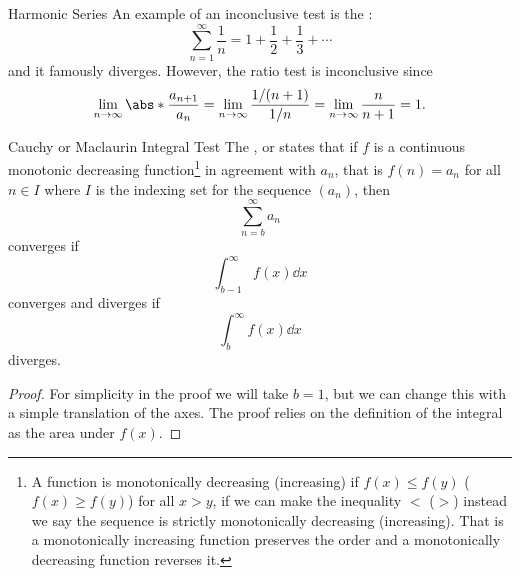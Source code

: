 \documentclass[fleqn]{NotesClass}
\begin{document}
    \begin{dfn}{Harmonic Series}{}
        An example of an inconclusive test is the :
        \begin{equation}
            \sum_{n=1}^{\infty} \frac{1}{n} = 1 + \frac{1}{2} + \frac{1}{3} + \dotsb
        \end{equation}
        and it famously diverges.
        However, the ratio test is inconclusive since
        \begin{equation}
            \lim_{n\to\infty} \abs*{\frac{a_{n+1}}{a_n}} = \lim_{n\to\infty} \frac{1/(n+1)}{1/n} = \lim_{n\to\infty} \frac{n}{n+1} = 1.
        \end{equation}
    \end{dfn}
    
    \begin{lma}{Cauchy or Maclaurin Integral Test}{}
        The , or  states that if \(f\) is a continuous monotonic decreasing function\footnote{A function is monotonically decreasing (increasing) if \(f(x) \le f(y)\) (\(f(x) \ge f(y)\)) for all \(x > y\), if we can make the inequality \(<\) (\(>\)) instead we say the sequence is strictly monotonically decreasing (increasing). That is a monotonically increasing function preserves the order and a monotonically decreasing function reverses it.} in agreement with \(a_n\), that is \(f(n) = a_n\) for all \(n\in I\) where \(I\) is the indexing set for the sequence \((a_n)\), then 
        \begin{equation}
            \sum_{n=b}^{\infty} a_n
        \end{equation}
        converges if
        \begin{equation}
            \int_{b-1}^{\infty} f(x)\dd{x}
        \end{equation}
        converges and diverges if
        \begin{equation}
            \int_b^{\infty} f(x)\dd{x}
        \end{equation}
        diverges.
        \begin{proof}
            For simplicity in the proof we will take \(b = 1\), but we can change this with a simple translation of the axes.
            The proof relies on the definition of the integral as the area under \(f(x)\).
            

\end{proof}
\end{lma}
\end{document}
